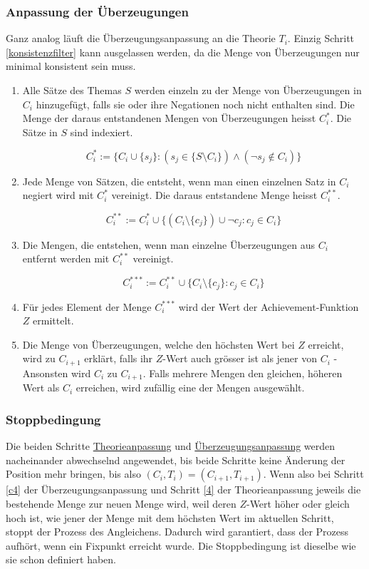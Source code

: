 \documentclass{article}
\begin{document}
\subsubsection{Anpassung der Überzeugungen} \label{C-Anpassung}
Ganz analog läuft die Überzeugungsanpassung an die Theorie $T_i$. Einzig Schritt \ref{konsistenzfilter} kann ausgelassen werden, da die Menge von Überzeugungen nur minimal konsistent sein muss.
\begin{enumerate}
    \item \label{c1} Alle Sätze des Themas $S$ werden einzeln zu der Menge von Überzeugungen in $C_i$ hinzugefügt, falls sie oder ihre Negationen noch nicht enthalten sind. Die Menge der daraus entstandenen Mengen von Überzeugungen heisst $C_i^*$. Die Sätze in $S$ sind indexiert.
    
    $$ 
    C_i^*:= \{ C_i \cup \{s_j\}: (s_j \in \{ S \setminus C_i \}) \land (\neg s_j \not\in C_i) \}
    $$
    
    \item \label{c1.1} Jede Menge von Sätzen, die entsteht, wenn man einen einzelnen Satz in $C_i$ negiert wird mit $C_i^*$ vereinigt. Die daraus entstandene Menge heisst $C_i^{**}$.
    
    $$
    C_i^{**}:= C_i^* \cup \{ (C_i \setminus \{c_j\}) \cup \neg c_j: c_j \in C_i\}
    $$
    
    \item \label{c2} Die Mengen, die entstehen, wenn man einzelne Überzeugungen aus $C_i$ entfernt werden mit $C_i^{**}$ vereinigt.
    
    $$
    C_i^{***}:= C_i^{**} \cup \{ C_i \setminus \{c_j\}: c_j \in C_i\}
    $$
    
    \item \label{c3} Für jedes Element der Menge $C_i^{***}$ wird der Wert der Achievement-Funktion $Z$ ermittelt.
    \item \label{c4}Die Menge von Überzeugungen, welche den höchsten Wert bei $Z$ erreicht, wird zu $C_{i+1}$ erklärt, falls ihr $Z$-Wert auch grösser ist als jener von $C_i$ - Ansonsten wird $C_i$ zu $C_{i+1}$. Falls mehrere Mengen den gleichen, höheren Wert als $C_i$ erreichen, wird zufällig eine der Mengen ausgewählt.\footnotemark[\value{footnote}]
\end{enumerate}

\subsubsection{Stoppbedingung}
Die beiden Schritte \hyperref[T-Anpassung]{Theorieanpassung} und \hyperref[C-Anpassung]{Überzeugungsanpassung} werden nacheinander abwechselnd angewendet, bis beide Schritte keine Änderung der Position mehr bringen, bis also $(C_i, T_i) = (C_{i+1}, T_{i+1})$. Wenn also bei Schritt \ref{c4} der Überzeugungsanpassung und Schritt \ref{4} der Theorieanpassung jeweils die bestehende Menge zur neuen Menge wird, weil deren $Z$-Wert höher oder gleich hoch ist, wie jener der Menge mit dem höchsten Wert im aktuellen Schritt, stoppt der Prozess des Angleichens. Dadurch wird garantiert, dass der Prozess aufhört, wenn ein Fixpunkt erreicht wurde. Die Stoppbedingung ist dieselbe wie \autocite[S. 11]{beisbart_making_2015} sie schon definiert haben.
\end{document}
